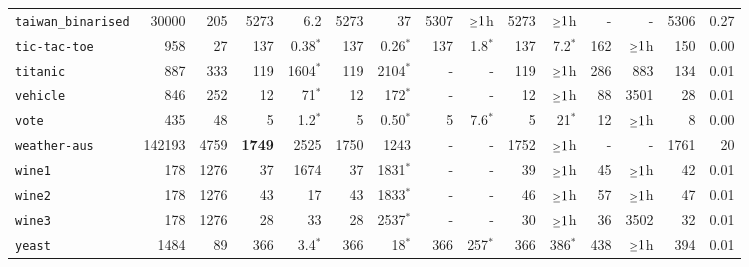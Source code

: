 \begin{tabular}{lccrrrrrrrrrrrr}
\texttt{taiwan\_binarised} & \multicolumn{1}{r}{30000} & \multicolumn{1}{r}{205}  & 5273 & 6.2 & 5273 & 37 & 5307 & $\mathsmaller{\geq}1$h & 5273 & $\mathsmaller{\geq}1$h & - & - & 5306 & 0.27\\
\texttt{tic-tac-toe} & \multicolumn{1}{r}{958} & \multicolumn{1}{r}{27}  & 137 & 0.38$^*$ & 137 & 0.26$^*$ & 137 & 1.8$^*$ & 137 & 7.2$^*$ & 162 & $\mathsmaller{\geq}1$h & 150 & 0.00\\
\texttt{titanic} & \multicolumn{1}{r}{887} & \multicolumn{1}{r}{333}  & 119 & 1604$^*$ & 119 & 2104$^*$ & - & - & 119 & $\mathsmaller{\geq}1$h & 286 & 883 & 134 & 0.01\\
\texttt{vehicle} & \multicolumn{1}{r}{846} & \multicolumn{1}{r}{252}  & 12 & 71$^*$ & 12 & 172$^*$ & - & - & 12 & $\mathsmaller{\geq}1$h & 88 & 3501 & 28 & 0.01\\
\texttt{vote} & \multicolumn{1}{r}{435} & \multicolumn{1}{r}{48}  & 5 & 1.2$^*$ & 5 & 0.50$^*$ & 5 & 7.6$^*$ & 5 & 21$^*$ & 12 & $\mathsmaller{\geq}1$h & 8 & 0.00\\
\texttt{weather-aus} & \multicolumn{1}{r}{142193} & \multicolumn{1}{r}{4759}  & \textbf{1749} & 2525 & 1750 & 1243 & - & - & 1752 & $\mathsmaller{\geq}1$h & - & - & 1761 & 20\\
\texttt{wine1} & \multicolumn{1}{r}{178} & \multicolumn{1}{r}{1276}  & 37 & 1674 & 37 & 1831$^*$ & - & - & 39 & $\mathsmaller{\geq}1$h & 45 & $\mathsmaller{\geq}1$h & 42 & 0.01\\
\texttt{wine2} & \multicolumn{1}{r}{178} & \multicolumn{1}{r}{1276}  & 43 & 17 & 43 & 1833$^*$ & - & - & 46 & $\mathsmaller{\geq}1$h & 57 & $\mathsmaller{\geq}1$h & 47 & 0.01\\
\texttt{wine3} & \multicolumn{1}{r}{178} & \multicolumn{1}{r}{1276}  & 28 & 33 & 28 & 2537$^*$ & - & - & 30 & $\mathsmaller{\geq}1$h & 36 & 3502 & 32 & 0.01\\
\texttt{yeast} & \multicolumn{1}{r}{1484} & \multicolumn{1}{r}{89}  & 366 & 3.4$^*$ & 366 & 18$^*$ & 366 & 257$^*$ & 366 & 386$^*$ & 438 & $\mathsmaller{\geq}1$h & 394 & 0.01\\
\bottomrule
\end{tabular}
